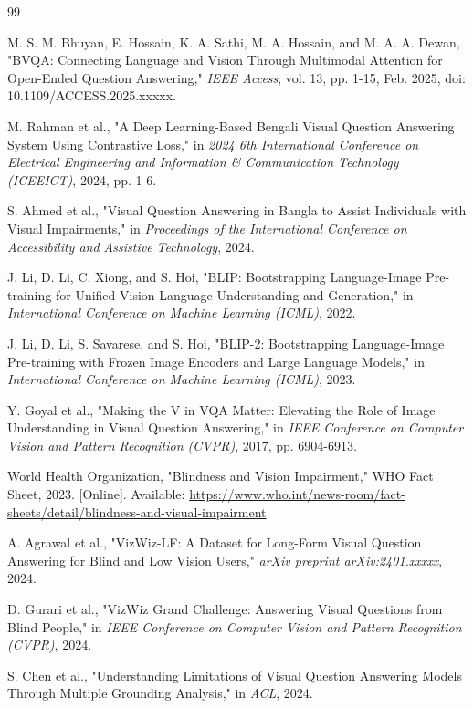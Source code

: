 \documentclass[conference]{IEEEtran}
\begin{document}
\begin{thebibliography}{99}

M. S. M. Bhuyan, E. Hossain, K. A. Sathi, M. A. Hossain, and M. A. A. Dewan, "BVQA: Connecting Language and Vision Through Multimodal Attention for Open-Ended Question Answering," \textit{IEEE Access}, vol. 13, pp. 1-15, Feb. 2025, doi: 10.1109/ACCESS.2025.xxxxx.

M. Rahman et al., "A Deep Learning-Based Bengali Visual Question Answering System Using Contrastive Loss," in \textit{2024 6th International Conference on Electrical Engineering and Information \& Communication Technology (ICEEICT)}, 2024, pp. 1-6.

S. Ahmed et al., "Visual Question Answering in Bangla to Assist Individuals with Visual Impairments," in \textit{Proceedings of the International Conference on Accessibility and Assistive Technology}, 2024.

J. Li, D. Li, C. Xiong, and S. Hoi, "BLIP: Bootstrapping Language-Image Pre-training for Unified Vision-Language Understanding and Generation," in \textit{International Conference on Machine Learning (ICML)}, 2022.

J. Li, D. Li, S. Savarese, and S. Hoi, "BLIP-2: Bootstrapping Language-Image Pre-training with Frozen Image Encoders and Large Language Models," in \textit{International Conference on Machine Learning (ICML)}, 2023.

Y. Goyal et al., "Making the V in VQA Matter: Elevating the Role of Image Understanding in Visual Question Answering," in \textit{IEEE Conference on Computer Vision and Pattern Recognition (CVPR)}, 2017, pp. 6904-6913.

World Health Organization, "Blindness and Vision Impairment," WHO Fact Sheet, 2023. [Online]. Available: \url{https://www.who.int/news-room/fact-sheets/detail/blindness-and-visual-impairment}

A. Agrawal et al., "VizWiz-LF: A Dataset for Long-Form Visual Question Answering for Blind and Low Vision Users," \textit{arXiv preprint arXiv:2401.xxxxx}, 2024.

D. Gurari et al., "VizWiz Grand Challenge: Answering Visual Questions from Blind People," in \textit{IEEE Conference on Computer Vision and Pattern Recognition (CVPR)}, 2024.

S. Chen et al., "Understanding Limitations of Visual Question Answering Models Through Multiple Grounding Analysis," in \textit{ACL}, 2024.


\end{thebibliography}
\end{document}
